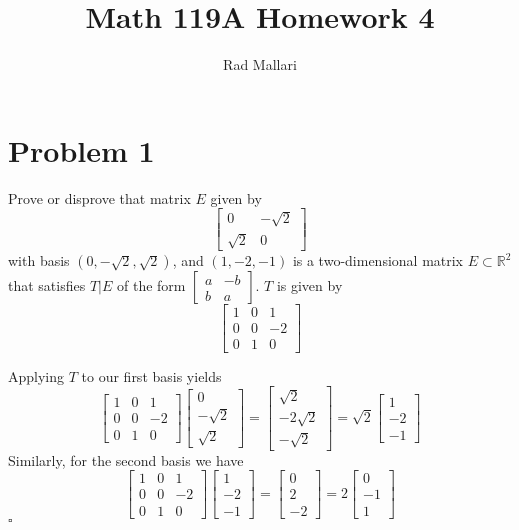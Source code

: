 \documentclass[11pt]{article}
\title{Math 119A Homework 4}
\author{Rad Mallari}
\newcommand{\R}{\mathbb{R}}
\newenvironment{proof}{\noindent{\bf Proof.}}{\hfill $\square$\medskip}
\begin{document}
\maketitle

\section{Problem 1}
Prove or disprove that matrix $E$ given by
$$\begin{bmatrix}
        0        & -\sqrt{2} \\
        \sqrt{2} & 0
    \end{bmatrix}$$
with basis $(0,-\sqrt{2},\sqrt{2})$, and $(1,-2,-1)$ is a two-dimensional
matrix $E\subset\R^{2}$ that satisfies $T\vert E$ of the form
$\begin{bmatrix}
        a & -b \\
        b & a
    \end{bmatrix}$. $T$ is given by
$$\begin{bmatrix}
    1&0&1\\
    0&0&-2\\
    0&1&0
\end{bmatrix}$$

\begin{proof}
 Applying $T$ to our first basis yields
 $$\begin{bmatrix}
    1&0&1\\
    0&0&-2\\
    0&1&0
 \end{bmatrix}\begin{bmatrix}
    0\\-\sqrt{2}\\\sqrt{2}
 \end{bmatrix}=\begin{bmatrix}
    \sqrt{2}\\-2\sqrt{2}\\-\sqrt{2}
 \end{bmatrix}=\sqrt{2}\begin{bmatrix}
    1\\-2\\-1
\end{bmatrix}$$
Similarly, for the second basis we have
$$\begin{bmatrix}
    1&0&1\\
    0&0&-2\\
    0&1&0
 \end{bmatrix}\begin{bmatrix}
    1\\-2\\-1
 \end{bmatrix}=\begin{bmatrix}
    0\\2\\-2
 \end{bmatrix}=2\begin{bmatrix}
    0\\-1\\1
 \end{bmatrix}$$
\end{proof}
\end{document}
